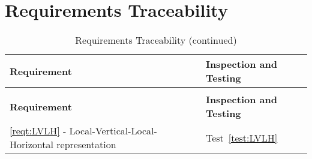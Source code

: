 \section{Requirements Traceability}

\begin{longtable}[c]{||p{3.5in}|p{3.5in}|}
\caption{Requirements Traceability} \\[6pt]
\hline
{\bf Requirement} & {\bf Inspection and Testing} \\ 
\hline \hline
\endfirsthead
\hline
\endfoot
\caption[]{Requirements Traceability (continued)} \\[6pt]
\hline
{\bf Requirement} & {\bf Inspection and Testing} \\ 
\hline \hline
\endhead
\ref{reqt:LVLH} - Local-Vertical-Local-Horizontal representation &
  Test~\ref{test:LVLH} \\ \hline

\end{longtable}
